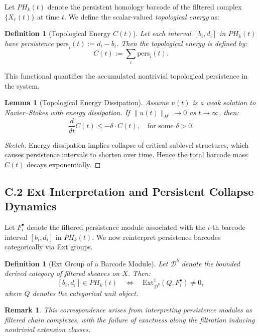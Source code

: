\documentclass[11pt]{article}
\newtheorem{definition}[theorem]{Definition}
\newtheorem{remark}[theorem]{Remark}
\newtheorem{lemma}[theorem]{Lemma}
\begin{document}
Let $PH_k(t)$ denote the persistent homology barcode of the filtered complex $\{X_r(t)\}$ at time $t$.  
We define the scalar-valued \emph{topological energy} as:

\begin{definition}[Topological Energy $C(t)$]
Let each interval $[b_i, d_i]$ in $PH_k(t)$ have persistence $\text{pers}_i(t) := d_i - b_i$.  
Then the topological energy is defined by:
\[
C(t) := \sum_i \text{pers}_i(t).
\]
\end{definition}

This functional quantifies the accumulated nontrivial topological persistence in the system.

\begin{lemma}[Topological Energy Dissipation]
Assume $u(t)$ is a weak solution to Navier--Stokes with energy dissipation.  
If $\|u(t)\|_{H^1} \to 0$ as $t \to \infty$, then:
\[
\frac{d}{dt} C(t) \leq -\delta \cdot C(t), \quad \text{for some } \delta > 0.
\]
\end{lemma}

\begin{proof}[Sketch]
Energy dissipation implies collapse of critical sublevel structures, which causes persistence intervals to shorten over time.  
Hence the total barcode mass $C(t)$ decays exponentially.
\end{proof}

\subsection*{C.2 Ext Interpretation and Persistent Collapse Dynamics}

Let \( F^\bullet_i \) denote the filtered persistence module associated with the \( i \)-th barcode interval \( [b_i, d_i] \) in \( PH_k(t) \).  
We now reinterpret persistence barcodes categorically via Ext groups.

\begin{definition}[Ext Group of a Barcode Module]
Let \( \mathcal{D}^b \) denote the bounded derived category of filtered sheaves on \( X \).  
Then:
\[
[b_i, d_i] \in PH_k(t) 
\quad \Longleftrightarrow \quad 
\mathrm{Ext}^1_{\mathcal{D}^b}(Q, F^\bullet_i) \neq 0,
\]
where \( Q \) denotes the categorical unit object.
\end{definition}

\begin{remark}
This correspondence arises from interpreting persistence modules as filtered chain complexes,  
with the failure of exactness along the filtration inducing nontrivial extension classes.
\end{remark}
\end{document}
